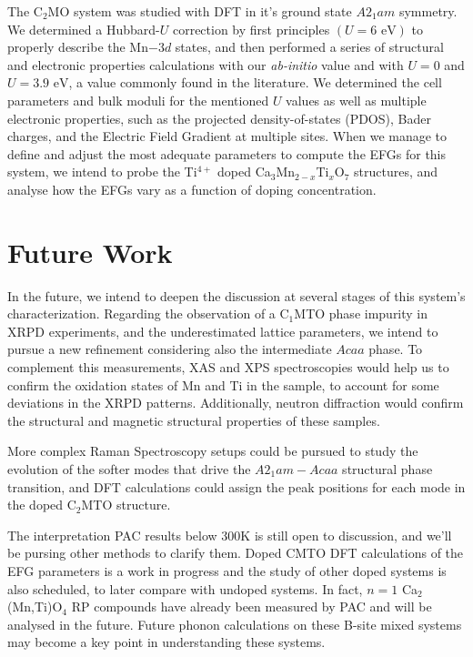 	The C$_{2}$MO system was studied with DFT in it's ground state $A2_{1}am$ symmetry. We determined a Hubbard-$U$ correction by first principles $(U=6\text{ eV})$ to properly describe the Mn$-3d$ states, and then performed a series of structural and electronic properties calculations with our \textit{ab-initio} value and with $U=0$ and $U=3.9 \text{ eV}$, a value commonly found in the literature. We determined the cell parameters and bulk moduli for the mentioned $U$ values as well as multiple electronic properties, such as the projected density-of-states (PDOS), Bader charges, and the Electric Field Gradient at multiple sites. When we manage to define and adjust the most adequate parameters to compute the EFGs for this system, we intend to probe the Ti$^{4+}$ doped Ca$_{3}$Mn$_{2-x}$Ti$_{x}$O$_{7}$ structures, and analyse how the EFGs vary as a function of doping concentration.

\section{Future Work}
	In the future, we intend to deepen the discussion at several stages of this system's characterization. Regarding the observation of a C$_{1}$MTO phase impurity in XRPD experiments, and the underestimated lattice parameters, we intend to pursue a new refinement considering also the intermediate $Acaa$ phase. To complement this measurements, XAS and XPS spectroscopies would help us to confirm the oxidation states of Mn and Ti in the sample, to account for some deviations in the XRPD patterns. Additionally, neutron diffraction would confirm the structural and magnetic structural properties of these samples.
	
	More complex Raman Spectroscopy setups could be pursued to study the evolution of the softer modes that drive the $A2_1am-Acaa$ structural phase transition, and DFT calculations could assign the peak positions for each mode in the doped C$_{2}$MTO structure.
	
	The interpretation PAC results below 300K is still open to discussion, and we'll be pursing other methods to clarify them. Doped CMTO DFT calculations of the EFG parameters is a work in progress and the study of other doped systems is also scheduled, to later compare with undoped systems. In fact, $n=1$ Ca$_{2}$(Mn,Ti)O$_{4}$ RP compounds have already been measured by PAC and will be analysed in the future. Future phonon calculations on these B-site mixed systems may become a key point in understanding these systems.